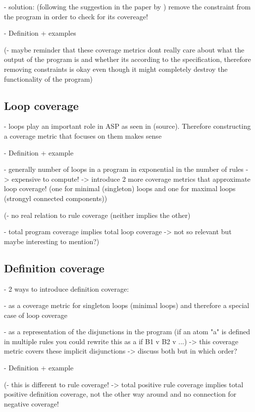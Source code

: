 - solution: (following the suggestion in the paper by \textcite{Jan+11}) remove the constraint from the program in order to check 
for its covereage!

- Definition + examples

(- maybe reminder that these coverage metrics dont really care about what the output of the program is and whether its according to 
the specification, therefore removing constraints is okay even though it might completely destroy the functionality of the program)

\subsection{Loop coverage}
\label{subsec:Coverage metrics/Branch-like coverage/Loop coverage}
- loops play an important role in ASP as seen in (source). Therefore constructing a coverage metric that focuses on them makes sense

- Definition + example

- generally number of loops in a program in exponential in the number of rules -> expensive to compute! -> introduce 2 more 
coverage metrics that approximate loop coverage! (one for minimal (singleton) loops and one for maximal loops (strongyl connected 
components))

(- no real relation to rule coverage (neither implies the other)

- total program coverage implies total loop coverage -> not so relevant but maybe interesting to mention?)

\subsection{Definition coverage}
\label{subsec:Coverage metrics/Branch-like coverage/Definition coverage}
- 2 ways to introduce definition coverage: 
    
    - as a coverage metric for singleton loops (minimal loops) and therefore a special case of loop coverage

    - as a representation of the disjunctions in the program (if an atom "a" is defined in multiple rules you could rewrite 
    this as a if B1 v B2 v ...) -> this coverage metric covers these implicit disjunctions
-> discuss both but in which order?

- Definition + example

(- this is different to rule coverage! -> total positive rule coverage implies total positive definition coverage, not the other 
way around and no connection for negative coverage!

